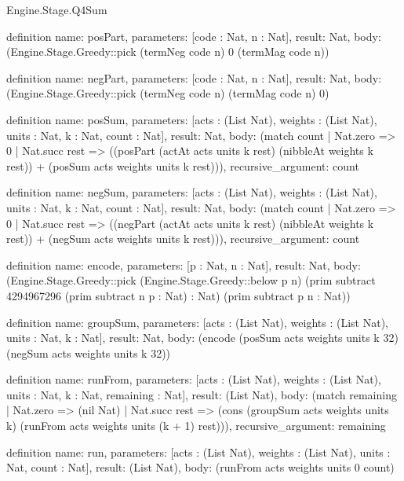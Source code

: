 \begin{lexlean}{Engine.Stage.Q4Sum}
\begin{semanticmodule}
definition{
  name: posPart,
  parameters: [code : Nat, n : Nat],
  result: Nat,
  body: (Engine.Stage.Greedy::pick (termNeg code n) 0 (termMag code n))
}

definition{
  name: negPart,
  parameters: [code : Nat, n : Nat],
  result: Nat,
  body: (Engine.Stage.Greedy::pick (termNeg code n) (termMag code n) 0)
}

definition{
  name: posSum,
  parameters: [acts : (List Nat), weights : (List Nat), units : Nat, k : Nat, count : Nat],
  result: Nat,
  body: (match count
    | Nat.zero => 0
    | Nat.succ rest => ((posPart (actAt acts units k rest) (nibbleAt weights k rest)) + (posSum acts weights units k rest))),
  recursive_argument: count
}

definition{
  name: negSum,
  parameters: [acts : (List Nat), weights : (List Nat), units : Nat, k : Nat, count : Nat],
  result: Nat,
  body: (match count
    | Nat.zero => 0
    | Nat.succ rest => ((negPart (actAt acts units k rest) (nibbleAt weights k rest)) + (negSum acts weights units k rest))),
  recursive_argument: count
}

definition{
  name: encode,
  parameters: [p : Nat, n : Nat],
  result: Nat,
  body: (Engine.Stage.Greedy::pick (Engine.Stage.Greedy::below p n) (prim subtract 4294967296 (prim subtract n p : Nat) : Nat) (prim subtract p n : Nat))
}

definition{
  name: groupSum,
  parameters: [acts : (List Nat), weights : (List Nat), units : Nat, k : Nat],
  result: Nat,
  body: (encode (posSum acts weights units k 32) (negSum acts weights units k 32))
}

definition{
  name: runFrom,
  parameters: [acts : (List Nat), weights : (List Nat), units : Nat, k : Nat, remaining : Nat],
  result: (List Nat),
  body: (match remaining
    | Nat.zero => (nil Nat)
    | Nat.succ rest => (cons (groupSum acts weights units k) (runFrom acts weights units (k + 1) rest))),
  recursive_argument: remaining
}

definition{
  name: run,
  parameters: [acts : (List Nat), weights : (List Nat), units : Nat, count : Nat],
  result: (List Nat),
  body: (runFrom acts weights units 0 count)
}
\end{semanticmodule}
\end{lexlean}
